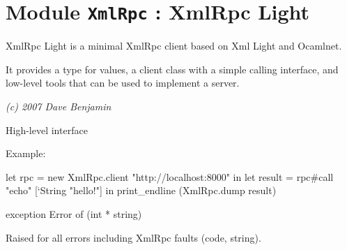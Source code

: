 \documentclass[11pt]{article}
\begin{document}
\section{Module {\tt{XmlRpc}} : XmlRpc Light}
\label{module:XmlRpc}



    XmlRpc Light is a minimal XmlRpc client based on Xml Light and Ocamlnet.


    It provides a type for values, a client class with a simple calling
    interface, and low-level tools that can be used to implement a server.


    {\it (c) 2007 Dave Benjamin}



\ocamldocvspace{0.5cm}



High-level interface



Example: \begin{ocamldoccode}

    let rpc = new XmlRpc.client "http://localhost:8000" in
    let result = rpc#call "echo" [`String "hello!"] in
    print_endline (XmlRpc.dump result) 
\end{ocamldoccode}




\label{exception:XmlRpc.Error}\begin{ocamldoccode}
exception Error of (int * string)
\end{ocamldoccode}
\begin{ocamldocdescription}
Raised for all errors including XmlRpc faults (code, string).


\end{ocamldocdescription}
\end{document}
